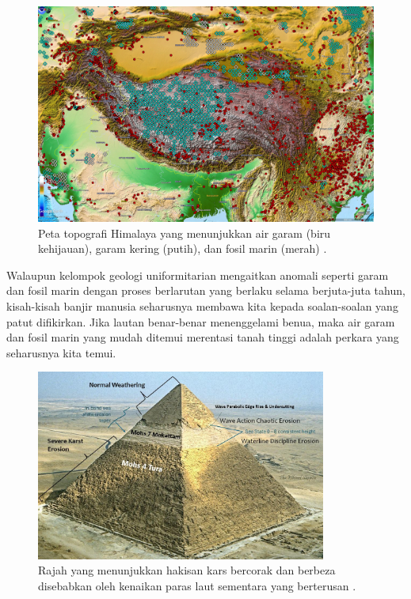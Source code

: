 \documentclass[10pt,twocolumn,letterpaper]{article}
\begin{document}
\begin{figure}[t]
\begin{center}
   \includegraphics[width=1\linewidth]{tibet.jpg}
\end{center}
   \caption{Peta topografi Himalaya yang menunjukkan air garam (biru kehijauan), garam kering (putih), dan fosil marin (merah) \cite{15,16,86,87}.}
\label{fig:3}
\label{fig:onecol}
\end{figure}

Walaupun kelompok geologi uniformitarian mengaitkan anomali seperti garam dan fosil marin dengan proses berlarutan yang berlaku selama berjuta-juta tahun, kisah-kisah banjir manusia seharusnya membawa kita kepada soalan-soalan yang patut difikirkan. Jika lautan benar-benar menenggelami benua, maka air garam dan fosil marin yang mudah ditemui merentasi tanah tinggi adalah perkara yang seharusnya kita temui.

\begin{figure}[t]
\begin{center}
\includegraphics[width=0.85\textwidth]{khafre.jpg}
\end{center}
   \caption{Rajah yang menunjukkan hakisan kars bercorak dan berbeza disebabkan oleh kenaikan paras laut sementara yang berterusan \cite{27}.}
\label{fig:4}
\end{figure}
\end{document}
